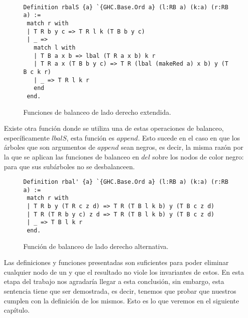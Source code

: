 \begin{figure}[!ht]
\centering
\captionsetup{justification=centering}
\begin{verbatim}

Definition rbalS {a} `{GHC.Base.Ord a} (l:RB a) (k:a) (r:RB a) :=
 match r with
 | T R b y c => T R l k (T B b y c)
 | _ =>
   match l with
   | T B a x b => lbal (T R a x b) k r
   | T R a x (T B b y c) => T R (lbal (makeRed a) x b) y (T B c k r)
   | _ => T R l k r
   end
 end.

\end{verbatim}
\caption{Funciones de balanceo de lado derecho extendida.}
\label{rbalS}
\end{figure}

Existe otra función donde se utiliza una de estas operaciones de balanceo, específicamente 
\hyperref[lbalS]{$lbalS$}, esta funci\'on es \hyperref[func_app]{$append$}. Esto sucede en el caso 
en que los \'arboles que son argumentos de \hyperref[func_app]{$append$} sean negros, es decir, la 
misma razón por la que se aplican las funciones de balanceo en \hyperref[func_del]{$del$} sobre los 
nodos de color negro: para que sus subárboles no se desbalanceen.

\begin{figure}[!ht]
\centering
\captionsetup{justification=centering}
\begin{verbatim}
Definition rbal' {a} `{GHC.Base.Ord a} (l:RB a) (k:a) (r:RB a) :=
 match r with
 | T R b y (T R c z d) => T R (T B l k b) y (T B c z d)
 | T R (T R b y c) z d => T R (T B l k b) y (T B c z d)
 | _ => T B l k r
 end.

\end{verbatim}
\caption{Funci\'on de balanceo de lado derecho alternativa.}
\label{rbal_2}
\end{figure}

Las definiciones y funciones presentadas son suficientes para poder eliminar cualquier nodo de un 
{\arn} y que el resultado no viole los invariantes de estos. En esta etapa del trabajo nos 
agradar\'ia llegar a esta  conclusi\'on, sin embargo, esta sentencia tiene que ser demostrada, es 
decir, tenemos que probar que nuestros {\arns} cumplen con la  definici\'on de los mismos. Esto es 
lo que veremos en el siguiente cap\'itulo.